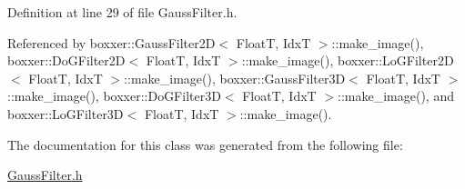 Definition at line 29 of file Gauss\+Filter.\+h.



Referenced by boxxer\+::\+Gauss\+Filter2\+D$<$ Float\+T, Idx\+T $>$\+::make\+\_\+image(), boxxer\+::\+Do\+G\+Filter2\+D$<$ Float\+T, Idx\+T $>$\+::make\+\_\+image(), boxxer\+::\+Lo\+G\+Filter2\+D$<$ Float\+T, Idx\+T $>$\+::make\+\_\+image(), boxxer\+::\+Gauss\+Filter3\+D$<$ Float\+T, Idx\+T $>$\+::make\+\_\+image(), boxxer\+::\+Do\+G\+Filter3\+D$<$ Float\+T, Idx\+T $>$\+::make\+\_\+image(), and boxxer\+::\+Lo\+G\+Filter3\+D$<$ Float\+T, Idx\+T $>$\+::make\+\_\+image().



The documentation for this class was generated from the following file\+:\begin{DoxyCompactItemize}
\item 
\hyperlink{GaussFilter_8h}{Gauss\+Filter.\+h}\end{DoxyCompactItemize}
